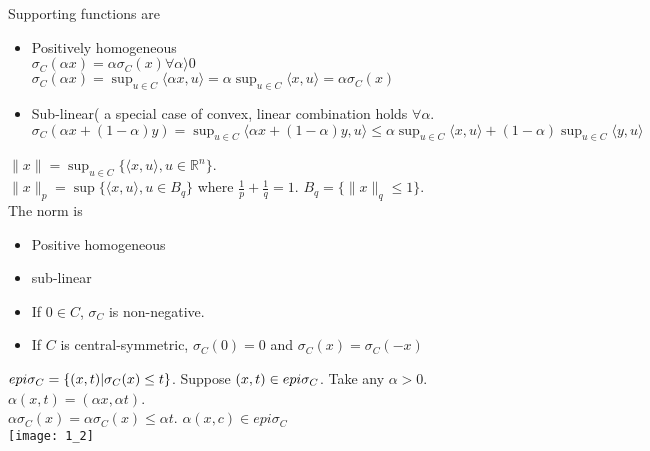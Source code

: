 \documentclass[11pt,fleqn]{book} %
\def\R{\mathbb{R}}
\begin{document}
Supporting functions are
\begin{itemize}
\item Positively homogeneous\\
$\sigma_C(\alpha x) = \alpha \sigma_C(x) \forall \alpha \rangle  0$ \\
$\sigma_C(\alpha x ) = \sup_{u \in C} \langle \alpha x, u\rangle  = \alpha \sup_{u \in C} \langle x, u\rangle  = \alpha \sigma_C(x)$
\item Sub-linear( a special case of convex, linear combination holds $\forall \alpha$.\\
$\sigma_C(\alpha x + (1 - \alpha) y ) = \sup_{u \in C} \langle \alpha x + (1 - \alpha) y,u\rangle  \le \alpha\sup_{u \in C}\langle x,u\rangle  + (1 - \alpha)\sup_{u \in C}\langle y,u\rangle  $
\end{itemize}
\begin{example}[L2-norm]
$\| x \| = \sup_{u \in C} \{ \langle x, u \rangle, u \in \R^n \}$.\\
$\|x \|_p = \sup \{ \langle x, u \rangle, u \in B_q \}$ where $\frac{1}{p} + \frac{1}{q} = 1$. $B_q = \{ \|x \|_q \le 1\}$.\\
The norm is 
\begin{itemize}
\item Positive homogeneous
\item sub-linear
\item If $0 \in C$, $\sigma_C$ is non-negative.
\item If $C$ is central-symmetric, $\sigma_C(0) = 0$ and $\sigma_C(x) = \sigma_C(-x)$
\end{itemize}
\end{example}

\begin{fact}
$epi \space \sigma_C = \{ (x,t) | \sigma_C(x) \le t\}$.
Suppose $(x,t) \in epi \space \sigma_C$. Take any  $\alpha > 0$. $\alpha(x,t) = (\alpha x, \alpha t)$.\\
$\alpha \sigma_C(x) = \alpha \sigma_C(x) \le \alpha t$. $\alpha(x,c) \in epi 
\sigma_C$\\
\texttt{[image: 1\_2]}
\end{fact}
\end{document}
